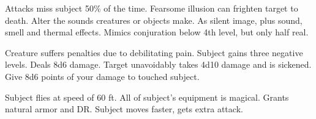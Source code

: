 \begin{swspelllist}
   Attacks miss subject 50\% of the time.
   Fearsome illusion can frighten target to death.
   Alter the sounds creatures or objects make.
   As silent image, plus sound, smell and thermal effects.
   Mimics conjuration below 4th level, but only half real.

   Creature suffers penalties due to debilitating pain.
   Subject gains three negative levels.
   Deals 8d6 damage.
   Target unavoidably takes 4d10 damage and is sickened.
   Give 8d6 points of your damage to touched subject.

   Subject flies at speed of 60 ft.
   All of subject's equipment is magical.
   Grants natural armor and DR.
   Subject moves faster, gets extra attack.
  \spellheadrestricted{}
\end{swspelllist}

